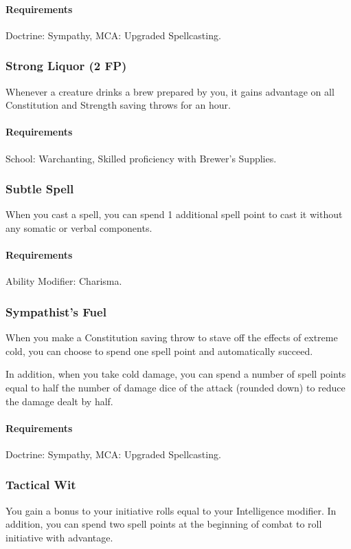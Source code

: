     \paragraph{Requirements} Doctrine: Sympathy, MCA: Upgraded Spellcasting.
\subsubsection{Strong Liquor (2 FP)} \label{feat::strongliquor}
    Whenever a creature drinks a brew prepared by you, it gains advantage on all Constitution and Strength saving throws for an hour.
    \paragraph{Requirements} School: Warchanting, Skilled proficiency with Brewer's Supplies.
\subsubsection{Subtle Spell} \label{feat::subtlespell}
    When you cast a spell, you can spend 1 additional spell point to cast it without any somatic or verbal components.
    \paragraph{Requirements} Ability Modifier: Charisma.
\subsubsection{Sympathist's Fuel} \label{feat::sympathistsfuel}
    When you make a Constitution saving throw to stave off the effects of extreme cold, you can choose to spend one spell point and automatically succeed.

    In addition, when you take cold damage, you can spend a number of spell points equal to half the number of damage dice of the attack (rounded down) to reduce the damage dealt by half.
    \paragraph{Requirements} Doctrine: Sympathy, MCA: Upgraded Spellcasting.
\subsubsection{Tactical Wit} \label{feat::tacticalwit}
    You gain a bonus to your initiative rolls equal to your Intelligence modifier.
    In addition, you can spend two spell points at the beginning of combat to roll initiative with advantage.
